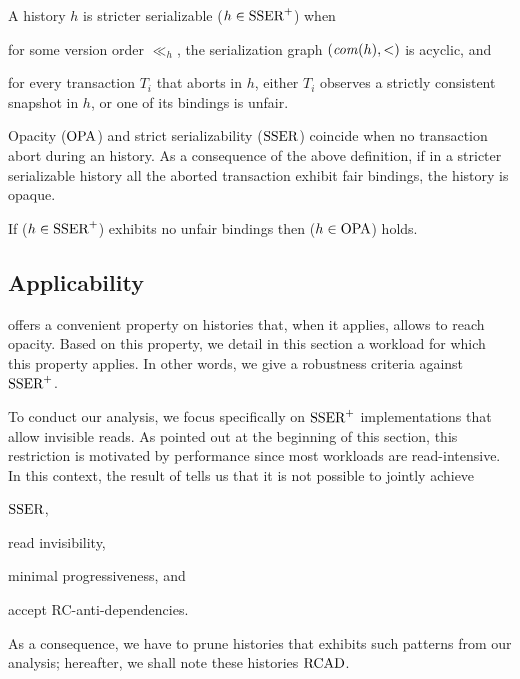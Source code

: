 \begin{definition}
  A history $h$ is stricter serializable ($h \in \SPSER$) when
  \begin{inparaenum}
  \item for some version order $\ll_h$, the serialization graph $(\committed{h},<)$ is acyclic, and
  \item for every transaction $T_i$ that aborts in $h$, either $T_i$ observes a strictly consistent snapshot in $h$, or one of its bindings is unfair.
  \end{inparaenum}
\end{definition}

Opacity ($\OPA$) and strict serializability ($\SSER$) coincide when no transaction abort during an history.
As a consequence of the above definition, if in a stricter serializable history all the aborted transaction exhibit fair bindings, the history is opaque.

\begin{corollary}
  If ($h \in \SPSER$) exhibits no unfair bindings then ($h \in \OPA$) holds.
\end{corollary}

\subsection{Applicability}

 offers a convenient property on histories that, when it applies, allows to reach opacity.
Based on this property, we detail in this section a workload for which this property applies.
In other words, we give a robustness criteria \cite{CeroneG16} against $\SPSER$.

To conduct our analysis, we focus specifically on $\SPSER$ implementations that allow invisible reads.
As pointed out at the beginning of this section, this restriction is motivated by performance since most workloads are read-intensive.
In this context, the result of \citet{hans16} tells us that it is not possible to jointly achieve
\begin{inparaenum}
\item $\SSER$,
\item read invisibility,
\item minimal progressiveness, and
\item accept RC-anti-dependencies.
\end{inparaenum}
As a consequence, we have to prune histories that exhibits such patterns from our analysis;
hereafter, we shall note these histories $\RCAD$.

